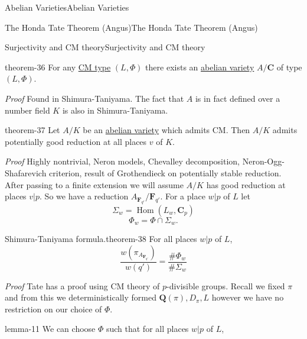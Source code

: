 \documentclass[10pt,]{book}
\makeatletter
\renewcommand*{\proofname}{Proof}
\renewenvironment{proof}[1][\proofname]{\par
  \pushQED{\qed}%
  \normalfont \topsep6\p@\@plus6\p@\relax
  \trivlist
  \item\relax
    {\itshape
    #1\@addpunct{.}}\hspace\labelsep\ignorespaces
}{%
  \popQED\endtrivlist\@endpefalse
}
\numberwithin{equation}{section}
\newcommand{\QQ}{\mathbf{Q}}
\newcommand{\CC}{\mathbf{C}}
\newcommand{\FF}{\mathbf{F}}
\DeclareMathOperator{\Hom}{Hom}
\makeatother
\begin{document}
\begin{chapterptx}{Abelian Varieties}{}{Abelian Varieties}{}{}
\begin{sectionptx}{The Honda Tate Theorem (Angus)}{}{The Honda Tate Theorem (Angus)}{}{}
\begin{subsectionptx}{Surjectivity and CM theory}{}{Surjectivity and CM theory}{}{}
\begin{theorem}{}{}{theorem-36}%
\hypertarget{p-444}{}%
For any \hyperref[def-cm-type]{CM type} \((L,\Phi)\) there exists an \hyperref[def-buntes-abvar]{abelian variety} \(A/\CC\) of type \((L, \Phi)\).%
\end{theorem}
\begin{proof}\hypertarget{proof-76}{}
\hypertarget{p-445}{}%
Found in Shimura-Taniyama.%
\end{proof}
\hypertarget{p-446}{}%
The fact that \(A\) is in fact defined over  a number field \(K\) is also in Shimura-Taniyama.%
\begin{theorem}{}{}{theorem-37}%
\hypertarget{p-447}{}%
Let \(A/K\) be an \hyperref[def-buntes-abvar]{abelian variety} which admits CM. Then \(A/K\) admits potentially good reduction at all places \(v\) of \(K\).%
\end{theorem}
\begin{proof}\hypertarget{proof-77}{}
\hypertarget{p-448}{}%
Highly nontrivial, Neron models, Chevalley decomposition, Neron-Ogg-Shafarevich criterion, result of Grothendieck on potentially stable reduction.%
\end{proof}
\hypertarget{p-449}{}%
After passing to a finite extension we will assume \(A/K\) has good reduction at places \(v|p\). So we have a reduction \(A_{\FF_{q'}}/\FF_{q'}\). For a place \(w|p\) of \(L\) let%
\begin{equation*}
\Sigma_w = \Hom(L_w, \CC_p)
\end{equation*}
%
\begin{equation*}
\Phi_w = \Phi \cap \Sigma_w\text{.}
\end{equation*}
%
\begin{theorem}{Shimura-Taniyama formula.}{}{theorem-38}%
\hypertarget{p-450}{}%
For all places \(w|p\) of \(L\),%
\begin{equation*}
\frac{w(\pi_{A_{\FF_{q'}}})}{w(q')} = \frac{\#\Phi_w}{\#\Sigma_w}
\end{equation*}
%
\end{theorem}
\begin{proof}\hypertarget{proof-78}{}
\hypertarget{p-451}{}%
Tate has a proof using CM theory of \(p\)-divisible groups.%
\end{proof}
\hypertarget{p-452}{}%
Recall we fixed \(\pi\) and from this we deterministically formed \(\QQ(\pi), D_{\pi}, L\) however we have no restriction on our choice of \(\Phi\).%
\begin{lemma}{}{}{lemma-11}%
\hypertarget{p-453}{}%
We can choose \(\Phi\) such that for all places \(w|p\) of \(L\),%

\end{lemma}
\end{subsectionptx}
\end{sectionptx}
\end{chapterptx}
\end{document}
